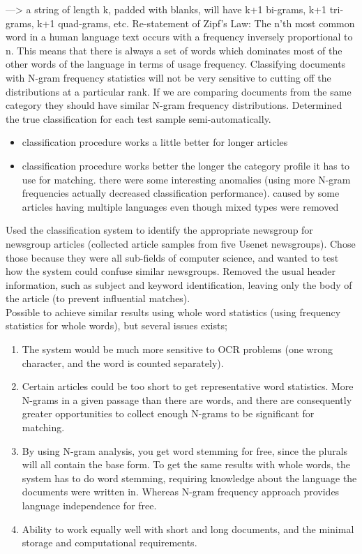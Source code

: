 ---> a string of length k, padded with blanks, will have k+1 bi-grams, k+1 tri-grams, k+1 quad-grams, etc.
Re-statement of Zipf's Law: The n'th most common word in a human language text occurs with a frequency inversely proportional to n. 
This means that there is always a set of words which dominates most of the other words of the language in terms of usage frequency. 
Classifying documents with N-gram frequency statistics will not be very sensitive to cutting off the distributions at a particular rank. 
If we are comparing documents from the same category they  should have similar N-gram frequency distributions.
Determined the true classification for each test sample semi-automatically.
\begin{itemize}
	\item classification procedure works a little better for longer articles
	\item classification procedure works better the longer the category profile it has to use for matching. 
	there were some interesting anomalies (using more N-gram frequencies actually decreased classification performance). 
	caused by some articles having multiple languages even though mixed types were removed
\end{itemize}
Used the classification system to identify the appropriate newsgroup for newsgroup articles (collected article samples from five Usenet newsgroups).
Chose those because they were all sub-fields of computer science, and wanted to test how the system could confuse similar newsgroups.
Removed the usual header information, such as subject and keyword identification, leaving only the body of the article (to prevent influential matches). \\
Possible to achieve similar results using whole word statistics (using frequency statistics for whole words), but several issues exists;
\begin{enumerate}
	\item The system would be much more sensitive to OCR problems (one wrong character, and the word is counted separately). 
	\item Certain articles could be too short to get representative word statistics. 
	More N-grams in a given passage than there are words, and there are consequently greater opportunities to collect enough N-grams to be significant for matching.
	\item By using N-gram analysis, you get word stemming for free, since the plurals will all contain the base form. 
	To get the same results with whole words, the system has to do word stemming, requiring knowledge about the language the documents were written in.  
	Whereas N-gram frequency approach provides language independence for free.
	\item Ability to work equally well with short and long documents, and the minimal storage and computational requirements.
\end{enumerate}
\cite{Cavnar1994}







